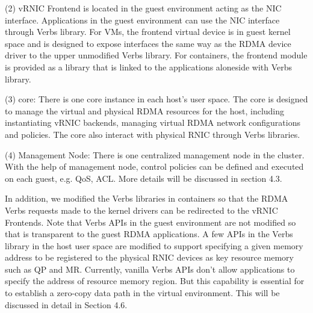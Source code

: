 
(2) vRNIC Frontend is located in the guest environment acting as the NIC interface. Applications in the guest environment can use the NIC interface through Verbs library. For VMs, the frontend virtual device is in guest kernel space and is designed to expose interfaces the same way as the RDMA device driver to the upper unmodified Verbs library. For containers, the frontend module is provided as a library that is linked to the applications aloneside with Verbs library.


(3) \sys core: There is one \sys core instance in each host's user space. The \sys core is designed to manage the virtual and physical RDMA resources for the host, including instantiating vRNIC backends, managing virtual RDMA network configurations and policies. The \sys core also interact with physical RNIC through Verbs libraries.


(4) Management Node: There is one centralized management node in the cluster. With the help of management node, control policies can be defined and executed on each guest, e.g. QoS, ACL. More details will be discussed in section 4.3.


In addition,  we modified the Verbs libraries in containers so that the RDMA Verbs requests made to the kernel drivers can be redirected to the vRNIC Frontends. Note that Verbs APIs in the guest environment are not modified so that \sys is transparent to the guest RDMA applications. A few APIs in the Verbs library in the host user space are modified to support specifying a given memory address to be registered to the physical RNIC devices as key resource memory such as QP and MR. Currently, vanilla Verbs APIs don't allow applications to specify the address of resource memory region. But this capability is essential for \sys to establish a zero-copy data path in the virtual environment. This will be discussed in detail in Section 4.6.
